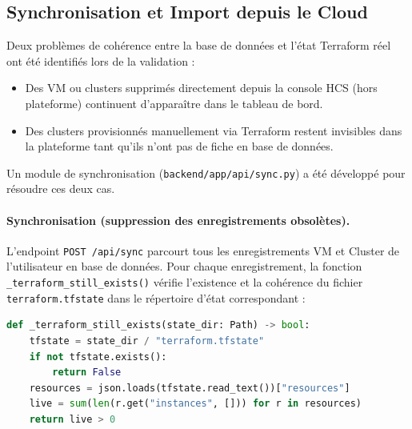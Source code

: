 
\subsection{Synchronisation et Import depuis le Cloud}

Deux problèmes de cohérence entre la base de données et l'état Terraform réel ont
été identifiés lors de la validation :

\begin{itemize}
  \item Des VM ou clusters supprimés directement depuis la console HCS (hors
        plateforme) continuent d'apparaître dans le tableau de bord.
  \item Des clusters provisionnés manuellement via Terraform restent invisibles dans
        la plateforme tant qu'ils n'ont pas de fiche en base de données.
\end{itemize}

Un module de synchronisation (\texttt{backend/app/api/sync.py}) a été développé
pour résoudre ces deux cas.

\paragraph{Synchronisation (suppression des enregistrements obsolètes).}
L'endpoint \texttt{POST /api/sync} parcourt tous les enregistrements VM et Cluster
de l'utilisateur en base de données. Pour chaque enregistrement, la fonction
\texttt{\_terraform\_still\_exists()} vérifie l'existence et la cohérence du fichier
\texttt{terraform.tfstate} dans le répertoire d'état correspondant :

\begin{lstlisting}[language=python,
  caption={Détection d'une ressource cloud supprimée via l'état Terraform},
  label={lst:sync_check}]
def _terraform_still_exists(state_dir: Path) -> bool:
    tfstate = state_dir / "terraform.tfstate"
    if not tfstate.exists():
        return False
    resources = json.loads(tfstate.read_text())["resources"]
    live = sum(len(r.get("instances", [])) for r in resources)
    return live > 0
\end{lstlisting}

